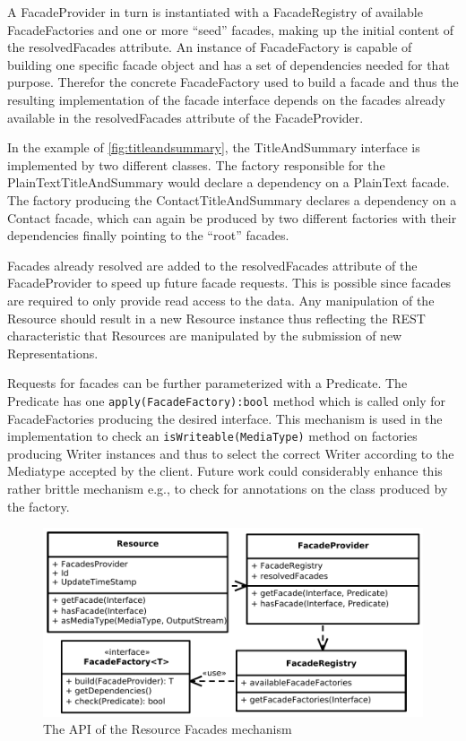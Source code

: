 \documentclass[11pt,a4paper,headsepline,twoside]{scrartcl}		%
\begin{document}
A FacadeProvider in turn is instantiated with a FacadeRegistry of available
FacadeFactories and one or more ``seed'' facades, making up the initial content
of the resolvedFacades attribute. An instance of FacadeFactory is capable of
building one specific facade object and has a set of dependencies needed for
that purpose. Therefor the concrete FacadeFactory used to build a facade and
thus the resulting implementation of the facade interface depends on the facades
already available in the resolvedFacades attribute of the FacadeProvider.

In the example of \autoref{fig:titleandsummary}, the TitleAndSummary interface
is implemented by two different classes. The factory responsible for the
PlainTextTitleAndSummary would declare a dependency on a PlainText facade. The
factory producing the ContactTitleAndSummary declares a dependency on a Contact
facade, which can again be produced by two different factories with their
dependencies finally pointing to the ``root'' facades.

Facades already resolved are added to the resolvedFacades attribute of the
FacadeProvider to speed up future facade requests. This is possible since
facades are required to only provide read access to the data. Any manipulation
of the Resource should result in a new Resource instance thus reflecting the
REST characteristic that Resources are manipulated by the submission of new
Representations.

Requests for facades can be further parameterized with a Predicate. The
Predicate has one \lstinline;apply(FacadeFactory):bool; method which is called
only for FacadeFactories producing the desired interface. This mechanism is used
in the implementation to check an \lstinline:isWriteable(MediaType): method on
factories producing Writer instances and thus to select the correct Writer
according to the Mediatype accepted by the client. Future work could
considerably enhance this rather brittle mechanism e.g., to check for
annotations on the class produced by the factory.

\begin{figure}[htb]
  \centering
  \includegraphics[width=1\textwidth]{resourcefacades}

  \caption{The API of the Resource Facades mechanism}
  \label{fig:resourcefacades}
\end{figure}
\end{document}
